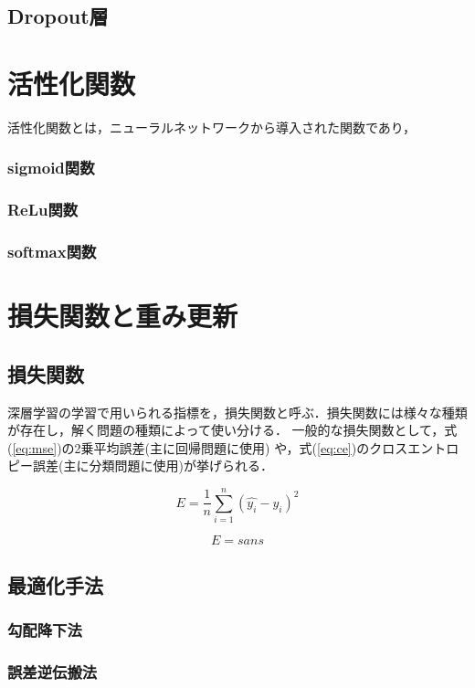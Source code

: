 \documentclass[a4j, 11pt]{jreport}
\begin{document}
\subsection{Dropout層}

\section{活性化関数}
活性化関数とは，ニューラルネットワークから導入された関数であり，
\subsubsection{sigmoid関数}
\subsubsection{ReLu関数}
\subsubsection{softmax関数}


\section{損失関数と重み更新}
\subsection{損失関数}
深層学習の学習で用いられる指標を，損失関数と呼ぶ．損失関数には様々な種類が存在し，解く問題の種類によって使い分ける．
一般的な損失関数として，式(\ref{eq:mse})の2乗平均誤差(主に回帰問題に使用) や，式(\ref{eq:ce})のクロスエントロピー誤差(主に分類問題に使用)が挙げられる．

\begin{equation}
	E = \frac{1}{n} \sum_{i=1}^{n} (\hat{y_i} - y_i)^2
	\label{eq:mse}
\end{equation}

\begin{equation}
	E = sans
	\label{eq:ce}
\end{equation}

\subsection{最適化手法}
\subsubsection{勾配降下法}
\subsubsection{誤差逆伝搬法}
\end{document}
